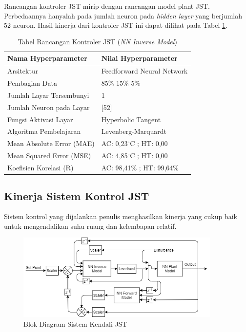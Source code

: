Rancangan kontroler JST mirip dengan rancangan model plant JST. Perbedaannya hanyalah pada jumlah neuron pada \textit{hidden layer} yang berjumlah 52 neuron. Hasil kinerja dari kontroler JST ini dapat dilihat pada Tabel \ref{tbl:5:NNControler}.

\begin{table}[!h]
	\caption{Tabel Rancangan Kontroler JST (\textit{NN Inverse Model})}
	\label{tbl:5:NNControler}
	\centering
	\begin{tabular}{|p{5.7cm}|p{5cm}|}
		\hline
		\textbf{Nama Hyperparameter} & \textbf{Nilai Hyperparameter} \\ \hline
		Arsitektur & Feedforward Neural Network \\ \hline
		Pembagian Data & 85\% 15\% 5\% \\ \hline 
		Jumlah Layar Tersembunyi & 1 \\ \hline
		Jumlah Neuron pada Layar & [52] \\ \hline
		Fungsi Aktivasi Layar & Hyperbolic Tangent \\ \hline
		Algoritma Pembelajaran & Levenberg-Marquardt \\ \hline
		Mean Absolute Error (MAE) & AC: 0,23$^\circ$C ; HT: 0,00 \\ \hline
		Mean Squared Error (MSE) & AC: 4,85$^\circ$C ; HT: 0,00 \\ \hline
		Koefisien Korelasi (R) & AC: 98,41\% ; HT: 99,64\% \\ \hline
	\end{tabular}
\end{table}

\hfill\break
\hfill\break

\subsection{Kinerja Sistem Kontrol JST}

Sistem kontrol yang dijalankan penulis menghasilkan kinerja yang cukup baik untuk mengendalikan suhu ruang dan kelembapan relatif.

\begin{figure}[!h]
	\centering
	\includegraphics[width=0.9\textwidth]{figures/ControlDesignDiagram}
	\caption{Blok Diagram Sistem Kendali JST}
	\label{fig:5:ConstrolSystemBlockDiagram}
\end{figure}

